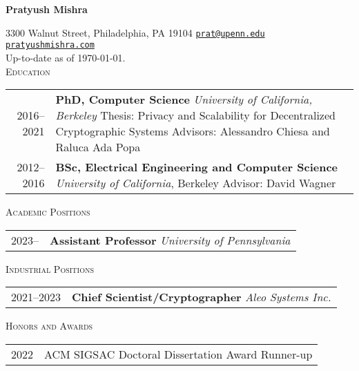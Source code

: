 \documentclass[11pt]{article}
\newenvironment{SectionTable}[1]{
	\renewcommand*{\arraystretch}{1.7}
	\setlength{\tabcolsep}{6pt}
  {\Large \textsc{#1}}
	\begin{longtable}{Rp{5.4in}}}
{\end{longtable}\vspace{-0.2cm}}
\newenvironment{SectionTableSingleSpace}[1]{
	\renewcommand*{\arraystretch}{1.2}
	\setlength{\tabcolsep}{6pt}
  {\Large \textsc{#1}}
	\begin{longtable}{Rp{5.4in}}}
{\end{longtable}\vspace{-0.2cm}}
\begin{document}
\begin{cv}{\vspace{-5em}}
  \begin{center}
    \huge
    \textbf{Pratyush Mishra}
  \end{center}
  \vspace{1em}

  3300 Walnut Street, Philadelphia, PA 19104\newline
  \href{mailto:prat@upenn.edu}{\texttt{prat@upenn.edu}}\newline
  \href{http://www.pratyushmishra.com}{\texttt{pratyushmishra.com}}\\
  Up-to-date as of \today.\\
  
  \begin{SectionTable}{Education}
    2016--2021 & 
    \textbf{PhD, Computer Science}\newline
    \emph{University of California, Berkeley}\newline
    Thesis: Privacy and Scalability for Decentralized Cryptographic Systems \newline
    Advisors: Alessandro Chiesa and Raluca Ada Popa
    \\

    2012--2016 & 
    \textbf{BSc, Electrical Engineering and Computer Science}\newline
    \emph{University of California}, Berkeley \newline
    Advisor: David Wagner
    \\
  \end{SectionTable}


  \begin{SectionTable}{Academic Positions}
    2023-- & 
    \textbf{Assistant Professor}\newline
    \emph{University of Pennsylvania}
  \end{SectionTable}

  \begin{SectionTable}{Industrial Positions}
    2021--2023 & 
    \textbf{Chief Scientist/Cryptographer}\newline
    \emph{Aleo Systems Inc.}
  \end{SectionTable}
  
  \begin{SectionTableSingleSpace}{Honors and Awards}
    2022 & 
    ACM SIGSAC Doctoral Dissertation Award Runner-up
  \end{SectionTableSingleSpace}
  

\end{cv}
\end{document}
